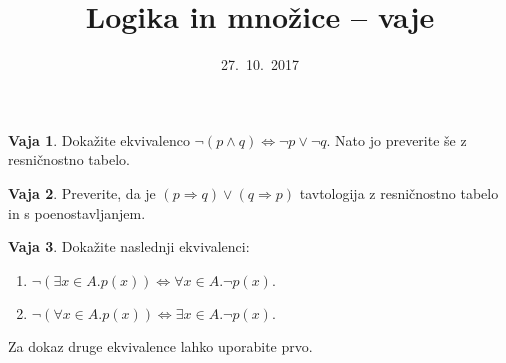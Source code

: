 \documentclass{article}
\newcommand{\lthen}{\Rightarrow}
\theoremstyle{definition}
\newtheorem{vaja}{Vaja}
\begin{document}
\title{Logika in množice -- vaje}
\date{27.~10.~2017}
\maketitle

\begin{vaja}
  Dokažite ekvivalenco $\lnot (p \land q) \iff \lnot p \lor \lnot q$.
  Nato jo preverite še z resničnostno tabelo.
\end{vaja}

\begin{vaja}
  Preverite, da je $(p \lthen q) \lor (q \lthen p)$ tavtologija z resničnostno tabelo in s
  poenostavljanjem.
\end{vaja}

\begin{vaja}
  Dokažite naslednji ekvivalenci:
  \begin{enumerate}
  \item  %
    $\lnot (\exists x \in A . p(x))
    \iff
    \forall x \in A . \lnot p(x).$
  \item
  $
    \lnot (\forall x \in A . p(x))
    \iff
    \exists x \in A . \lnot p(x).
  $
  \end{enumerate}
  Za dokaz druge ekvivalence lahko uporabite prvo.
\end{vaja}
\end{document}
